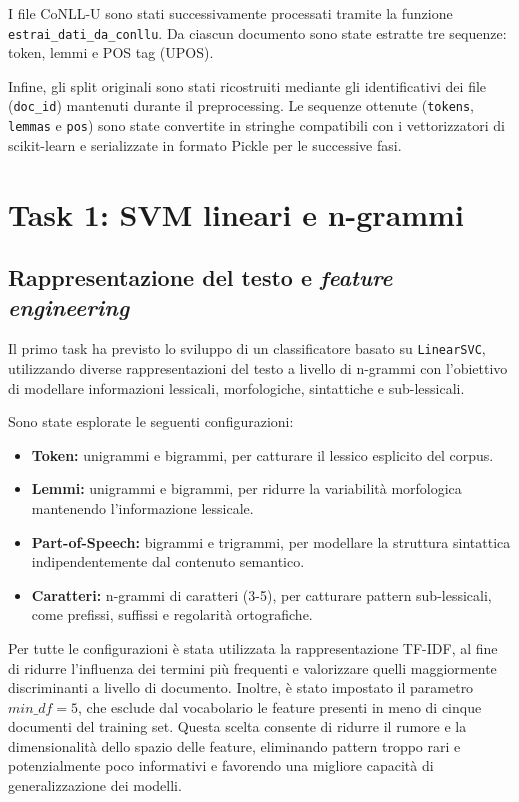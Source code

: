 \documentclass{article}
\begin{document}
I file CoNLL-U sono stati successivamente processati tramite la funzione \texttt{estrai\_dati\_da\_conllu}. Da ciascun documento sono state estratte tre sequenze: token, lemmi e POS tag (UPOS).

Infine, gli split originali sono stati ricostruiti mediante gli identificativi dei file (\texttt{doc\_id}) mantenuti durante il preprocessing. Le sequenze ottenute (\texttt{tokens}, \texttt{lemmas} e \texttt{pos}) sono state convertite in stringhe compatibili con i vettorizzatori di scikit-learn e serializzate in formato Pickle per le successive fasi.

\section{Task 1: SVM lineari e n-grammi}

\subsection{Rappresentazione del testo e \textit{feature engineering}}

Il primo task ha previsto lo sviluppo di un classificatore basato su \texttt{LinearSVC}, utilizzando diverse rappresentazioni del testo a livello di n-grammi con l’obiettivo di modellare informazioni lessicali, morfologiche, sintattiche e sub-lessicali.

Sono state esplorate le seguenti configurazioni:
\begin{itemize}
    \item \textbf{Token:} unigrammi e bigrammi, per catturare il lessico esplicito del corpus.
    \item \textbf{Lemmi:} unigrammi e bigrammi, per ridurre la variabilità morfologica mantenendo l’informazione lessicale.
    \item \textbf{Part-of-Speech:} bigrammi e trigrammi, per modellare la struttura sintattica indipendentemente dal contenuto semantico.
    \item \textbf{Caratteri:} n-grammi di caratteri (3-5), per catturare pattern sub-lessicali, come prefissi, suffissi e regolarità ortografiche.
\end{itemize}

Per tutte le configurazioni è stata utilizzata la rappresentazione TF-IDF, al fine di ridurre l'influenza dei termini più frequenti e valorizzare quelli maggiormente discriminanti a livello di documento. Inoltre, è stato impostato il parametro $min\_df = 5$, che esclude dal vocabolario le feature presenti in meno di cinque documenti del training set. Questa scelta consente di ridurre il rumore e la dimensionalità dello spazio delle feature, eliminando pattern troppo rari e potenzialmente poco informativi e favorendo una migliore capacità di generalizzazione dei modelli.
\end{document}
